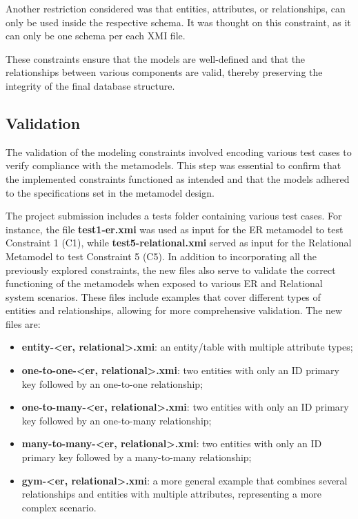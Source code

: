 \documentclass[10pt]{article}
\begin{document}
Another restriction considered was that entities, attributes, or relationships, can only be used inside the respective schema. It was thought on this constraint, as it can only be one schema per each XMI file.

These constraints ensure that the models are well-defined and that the relationships between various components are valid, thereby preserving the integrity of the final database structure.

\subsection{Validation}

The validation of the modeling constraints involved encoding various test cases to verify compliance with the metamodels. This step was essential to confirm that the implemented constraints functioned as intended and that the models adhered to the specifications set in the metamodel design.

The project submission includes a tests folder containing various test cases. For instance, the file \textbf{test1-er.xmi} was used as input for the ER metamodel to test Constraint 1 (C1), while \textbf{test5-relational.xmi} served as input for the Relational Metamodel to test Constraint 5 (C5).  In addition to incorporating all the previously explored constraints, the new files also serve to validate the correct functioning of the metamodels when exposed to various ER and Relational system scenarios. These files include examples that cover different types of entities and relationships, allowing for more comprehensive validation. The new files are:

\begin{itemize}

    \item \textbf{entity-\textless{}er, relational\textgreater{}.xmi}: an entity/table with multiple attribute types;
    
    \item \textbf{one-to-one-\textless{}er, relational\textgreater{}.xmi}: two entities with only an ID primary key followed by an one-to-one relationship;
    
    \item \textbf{one-to-many-\textless{}er, relational\textgreater{}.xmi}: two entities with only an ID primary key followed by an one-to-many relationship;
    
    \item \textbf{many-to-many-\textless{}er, relational\textgreater{}.xmi}: two entities with only an ID primary key followed by a many-to-many relationship;
    
    \item \textbf{gym-\textless{}er, relational\textgreater{}.xmi}: a more general example that combines several relationships and entities with multiple attributes, representing a more complex scenario.
    
\end{itemize}
\end{document}
